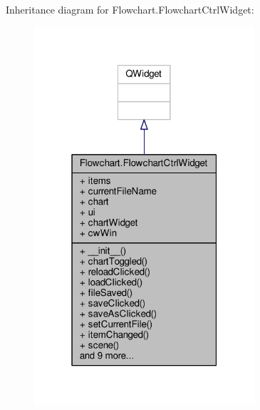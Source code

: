Inheritance diagram for Flowchart.\+Flowchart\+Ctrl\+Widget\+:\nopagebreak
\begin{figure}[H]
\begin{center}
\leavevmode
\includegraphics[width=232pt]{d6/dcf/classFlowchart_1_1FlowchartCtrlWidget__inherit__graph}
\end{center}
\end{figure}


